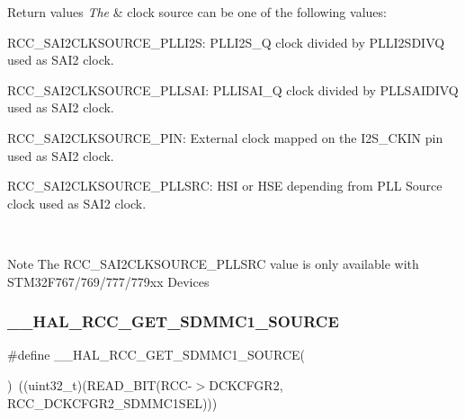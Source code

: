 \begin{DoxyRetVals}{Return values}
{\em The} & clock source can be one of the following values\+: \begin{DoxyItemize}
\item R\+C\+C\+\_\+\+S\+A\+I2\+C\+L\+K\+S\+O\+U\+R\+C\+E\+\_\+\+P\+L\+L\+I2S\+: P\+L\+L\+I2\+S\+\_\+Q clock divided by P\+L\+L\+I2\+S\+D\+I\+VQ used as S\+A\+I2 clock. \item R\+C\+C\+\_\+\+S\+A\+I2\+C\+L\+K\+S\+O\+U\+R\+C\+E\+\_\+\+P\+L\+L\+S\+AI\+: P\+L\+L\+I\+S\+A\+I\+\_\+Q clock divided by P\+L\+L\+S\+A\+I\+D\+I\+VQ used as S\+A\+I2 clock. \item R\+C\+C\+\_\+\+S\+A\+I2\+C\+L\+K\+S\+O\+U\+R\+C\+E\+\_\+\+P\+IN\+: External clock mapped on the I2\+S\+\_\+\+C\+K\+IN pin used as S\+A\+I2 clock. \item R\+C\+C\+\_\+\+S\+A\+I2\+C\+L\+K\+S\+O\+U\+R\+C\+E\+\_\+\+P\+L\+L\+S\+RC\+: H\+SI or H\+SE depending from P\+LL Source clock used as S\+A\+I2 clock. \end{DoxyItemize}
\\
\hline
\end{DoxyRetVals}
\begin{DoxyNote}{Note}
The R\+C\+C\+\_\+\+S\+A\+I2\+C\+L\+K\+S\+O\+U\+R\+C\+E\+\_\+\+P\+L\+L\+S\+RC value is only available with S\+T\+M32\+F767/769/777/779xx Devices 
\end{DoxyNote}
\mbox{\label{group___r_c_c_ex___exported___macros_gaec0b9b20a99feaf35a2b072485b82b83}} 
\subsubsection{\texorpdfstring{\_\_HAL\_RCC\_GET\_SDMMC1\_SOURCE}{\_\_HAL\_RCC\_GET\_SDMMC1\_SOURCE}}
{\footnotesize\ttfamily \#define \+\_\+\+\_\+\+H\+A\+L\+\_\+\+R\+C\+C\+\_\+\+G\+E\+T\+\_\+\+S\+D\+M\+M\+C1\+\_\+\+S\+O\+U\+R\+CE(\begin{DoxyParamCaption}{ }\end{DoxyParamCaption})~((uint32\+\_\+t)(R\+E\+A\+D\+\_\+\+B\+IT(R\+CC-\/$>$D\+C\+K\+C\+F\+G\+R2, R\+C\+C\+\_\+\+D\+C\+K\+C\+F\+G\+R2\+\_\+\+S\+D\+M\+M\+C1\+S\+EL)))}



